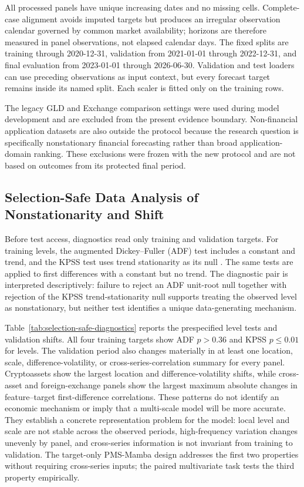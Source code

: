 All processed panels have unique increasing dates and no missing cells.
Complete-case alignment avoids imputed targets but produces an irregular observation calendar governed by common market availability; horizons are therefore measured in panel observations, not elapsed calendar days.
The fixed splits are training through 2020-12-31, validation from 2021-01-01 through 2022-12-31, and final evaluation from 2023-01-01 through 2026-06-30.
Validation and test loaders can use preceding observations as input context, but every forecast target remains inside its named split.
Each scaler is fitted only on the training rows.

The legacy GLD and Exchange comparison settings were used during model development and are excluded from the present evidence boundary.
Non-financial application datasets are also outside the protocol because the research question is specifically nonstationary financial forecasting rather than broad application-domain ranking.
These exclusions were frozen with the new protocol and are not based on outcomes from its protected final period.

\subsection{Selection-Safe Data Analysis of Nonstationarity and Shift}

Before test access, diagnostics read only training and validation targets.
For training levels, the augmented Dickey--Fuller (ADF) test includes a constant and trend, and the KPSS test uses trend stationarity as its null \cite{dickey-fuller,kpss}.
The same tests are applied to first differences with a constant but no trend.
The diagnostic pair is interpreted descriptively: failure to reject an ADF unit-root null together with rejection of the KPSS trend-stationarity null supports treating the observed level as nonstationary, but neither test identifies a unique data-generating mechanism.

Table~\ref{tab:selection-safe-diagnostics} reports the prespecified level tests and validation shifts.
All four training targets show ADF $p>0.36$ and KPSS $p\leq0.01$ for levels.
The validation period also changes materially in at least one location, scale, difference-volatility, or cross-series-correlation summary for every panel.
Cryptoassets show the largest location and difference-volatility shifts, while cross-asset and foreign-exchange panels show the largest maximum absolute changes in feature--target first-difference correlations.
These patterns do not identify an economic mechanism or imply that a multi-scale model will be more accurate.
They establish a concrete representation problem for the model: local level and scale are not stable across the observed periods, high-frequency variation changes unevenly by panel, and cross-series information is not invariant from training to validation.
The target-only PMS-Mamba design addresses the first two properties without requiring cross-series inputs; the paired multivariate task tests the third property empirically.

